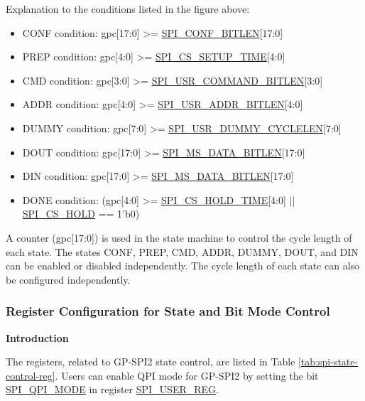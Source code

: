 \documentclass[main\_\_EN.tex]{subfiles}
\begin{document}
Explanation to the conditions listed in the figure above:
\begin{itemize}
    \item CONF condition: gpc[17:0] >= \hyperref[fielddesc:SPICONFBITLEN]{SPI\_CONF\_BITLEN}[17:0]
    \item PREP condition: gpc[4:0] >= \hyperref[fielddesc:SPICSSETUPTIME]{SPI\_CS\_SETUP\_TIME}[4:0]
    \item CMD condition: gpc[3:0] >= \hyperref[fielddesc:SPIUSRCOMMANDBITLEN]{SPI\_USR\_COMMAND\_BITLEN}[3:0]
    \item ADDR condition: gpc[4:0] >= \hyperref[fielddesc:SPIUSRADDRBITLEN]{SPI\_USR\_ADDR\_BITLEN}[4:0]
    \item DUMMY condition: gpc[7:0] >= \hyperref[fielddesc:SPIUSRDUMMYCYCLELEN]{SPI\_USR\_DUMMY\_CYCLELEN}[7:0]
    \item DOUT condition: gpc[17:0] >= \hyperref[fielddesc:SPIMSDATABITLEN]{SPI\_MS\_DATA\_BITLEN}[17:0]
    \item DIN condition: gpc[17:0] >= \hyperref[fielddesc:SPIMSDATABITLEN]{SPI\_MS\_DATA\_BITLEN}[17:0]

    \item DONE condition: (gpc[4:0] >= \hyperref[fielddesc:SPICSHOLDTIME]{SPI\_CS\_HOLD\_TIME}[4:0] || \hyperref[fielddesc:SPICSHOLD]{SPI\_CS\_HOLD} == 1'b0)

\end{itemize}





A counter (gpc[17:0]) is used in the state machine to control the cycle length of each state. The states CONF, PREP, CMD, ADDR, DUMMY, DOUT, and DIN can be enabled or disabled independently. The cycle length of each state can also be configured independently.

\subsubsection{Register Configuration for State and Bit Mode Control} \label{sec:spi-state-bit-mode-control-reg-config}

\textbf{Introduction}

The registers, related to GP-SPI2 state control, are listed in Table \ref{tab:spi-state-control-reg}. Users can enable QPI mode for GP-SPI2 by setting the bit \hyperref[fielddesc:SPIQPIMODE]{SPI\_QPI\_MODE} in register \hyperref[regdesc:SPIUSERREG]{SPI\_USER\_REG}.
\end{document}

